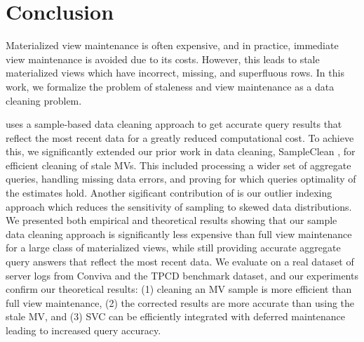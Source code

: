 \vspace{-1em}
\section{Conclusion}\label{conclusion}
\vspace{-.3em}
Materialized view maintenance is often expensive, and in practice, immediate view maintenance is avoided due to its costs.
However, this leads to stale materialized views which have incorrect, missing, and superfluous rows.
In this work, we formalize the problem of staleness and view maintenance as a data cleaning problem.

\svc uses a sample-based data cleaning approach to get accurate query results that reflect the most recent data for a greatly reduced computational cost.
To achieve this, we significantly extended our prior work in data cleaning, SampleClean \cite{wang1999sample}, for efficient cleaning of stale MVs. 
This included processing a wider set of aggregate queries, handling missing data errors, and proving for which queries optimality of the estimates hold.
Another sigificant contribution of \svc is our outlier indexing approach which reduces the sensitivity of sampling to skewed data distributions.
We presented both empirical and theoretical results showing that our sample data cleaning approach is significantly less expensive than full view maintenance for a large class of materialized views, while still providing accurate aggregate query answers that reflect the most recent data.
We evaluate \svc on a real dataset of server logs from Conviva and the TPCD benchmark dataset, and our experiments confirm our theoretical results: (1) cleaning an MV sample is more efficient than full view maintenance, (2) the corrected results are more accurate than using the stale MV, and (3) SVC can be efficiently integrated with deferred maintenance leading to increased query accuracy. 





